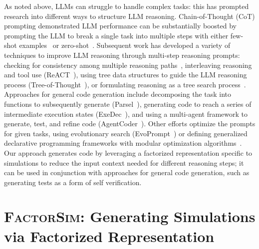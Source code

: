\documentclass{article}
\theoremstyle{plain}
\theoremstyle{definition}
\theoremstyle{remark}
\newcommand{\method}{\textsc{FactorSim}\xspace}
\begin{document}
As noted above, LLMs can struggle to handle complex tasks: this has prompted research into different ways to structure LLM reasoning.
Chain-of-Thought (CoT) prompting demonstrated LLM performance can be substantially boosted by prompting the LLM to break a single task into multiple steps with either few-shot examples~\cite{wei2022chain} or zero-shot~\cite{kojima2022zeroshotcot}.
Subsequent work has developed a variety of techniques to improve LLM reasoning through multi-step reasoning prompts: checking for consistency among multiple reasoning paths~\cite{wang2023selfconsistency}, interleaving reasoning and tool use (ReACT~\cite{yao2022react}), using tree data structures to guide the LLM reasoning process (Tree-of-Thought~\cite{yao2024tree}), or formulating reasoning as a tree search process~\cite{hao2023rap,zhou2023lats}.
Approaches for general code generation include decomposing the task into functions to subsequently generate (Parsel~\cite{zelikman2023parsel}), generating code to reach a series of intermediate execution states (ExeDec~\cite{shi2023exedec}), and using a multi-agent framework to generate, test, and refine code (AgentCoder~\cite{huang2023agentcoder}).
Other efforts optimize the prompts for given tasks, using evolutionary search (EvoPrompt~\cite{guo2024connecting}) or defining generalized declarative programming frameworks with modular optimization algorithms~\cite{khattab2024dspy}.
Our approach generates code by leveraging a factorized representation specific to simulations to reduce the input context needed for different reasoning steps; it can be used in conjunction with approaches for general code generation, such as generating tests as a form of self verification.


































 

\section{\method{}: Generating Simulations via Factorized Representation}
\end{document}

